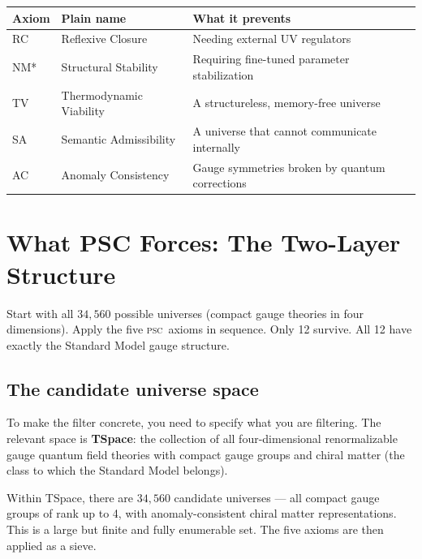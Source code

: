 \documentclass[11pt,a4paper]{article}
\newcommand{\term}[1]{\textbf{#1}}
\newcommand{\PSC}{\textsc{psc}}
\begin{document}
\bigskip

\begin{center}
\begin{tabular}{@{}lll@{}}
\toprule
\textbf{Axiom} & \textbf{Plain name} & \textbf{What it prevents} \\
\midrule
RC & Reflexive Closure  & Needing external UV regulators \\
NM* & Structural Stability & Requiring fine-tuned parameter stabilization \\
TV & Thermodynamic Viability & A structureless, memory-free universe \\
SA & Semantic Admissibility & A universe that cannot communicate internally \\
AC & Anomaly Consistency & Gauge symmetries broken by quantum corrections \\
\bottomrule
\end{tabular}
\end{center}

\section{What PSC Forces: The Two-Layer Structure}
\label{sec:twolayer}

\begin{tcolorbox}[colback=boxblue,colframe=blue!40!black,
  title=The punchline]
Start with all $34{,}560$ possible universes (compact gauge theories in four
dimensions).  Apply the five \PSC\ axioms in sequence.  Only 12 survive.
All 12 have exactly the Standard Model gauge structure.
\end{tcolorbox}

\subsection{The candidate universe space}

To make the filter concrete, you need to specify what you are filtering.
The relevant space is \term{TSpace}: the collection of all
four-dimensional renormalizable gauge quantum field theories with compact gauge groups
and chiral matter (the class to which the Standard Model belongs).

Within TSpace, there are $34{,}560$ candidate universes — all compact gauge groups of
rank up to 4, with anomaly-consistent chiral matter representations.
This is a large but finite and fully enumerable set.  The five axioms are then applied
as a sieve.
\end{document}
